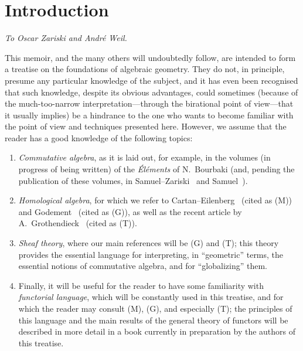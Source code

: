 \documentclass[openany,oneside]{amsbook}
\theoremstyle{ega-env-style}
\theoremstyle{ega-thm-env-style}
\theoremstyle{ega-defn-env-style}
\newcommand{\oldpage}[2][]{{\marginnote{\normalfont{\textbf{#1}~|~#2}}}\ignorespaces}
\begin{document}
\chapter*{Introduction}

\label{section:intro}

\begin{flushright}
\emph{To Oscar Zariski and Andr\'e Weil.}
\end{flushright}
\medskip

\oldpage[I]{5}
This memoir, and the many others will undoubtedly follow, are intended to form a treatise on the foundations of algebraic geometry.
They do not, in principle, presume any particular knowledge of the subject, and it has even been recognised that such knowledge, despite its obvious advantages, could sometimes (because of the much-too-narrow interpretation---through the birational point of view---that it usually implies) be a hindrance to the one who wants to become familiar with the point of view and techniques presented here.
However, we assume that the reader has a good knowledge of the following topics:
\begin{enumerate}
  \item[(a)] \emph{Commutative algebra}, as it is laid out, for example, in the volumes (in progress of being written) of the \emph{\'El\'ements} of N.~Bourbaki (and, pending the publication of these volumes, in Samuel--Zariski~\cite{I-13} and Samuel~\cite{I-11,I-12}).
  \item[(b)] \emph{Homological algebra}, for which we refer to Cartan--Eilenberg~\cite{I-2} (cited as (M)) and Godement~\cite{I-4} (cited as (G)), as well as the recent article by A.~Grothendieck~\cite{I-6} (cited as (T)).
  \item[(c)] \emph{Sheaf theory}, where our main references will be (G) and (T);
   this theory provides the essential language for interpreting, in ``geometric'' terms, the essential notions of commutative algebra, and for ``globalizing'' them.
  \item[(d)] Finally, it will be useful for the reader to have some familiarity with \emph{functorial language}, which will be constantly used in this treatise, and for which the reader may consult (M), (G), and especially (T);
    the principles of this language and the main results of the general theory of functors will be described in more detail in a book currently in preparation by the authors of this treatise.
\end{enumerate}
\end{document}
